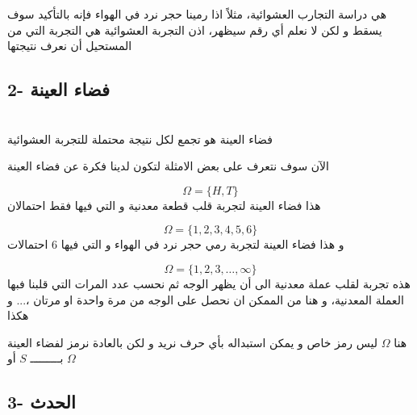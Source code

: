 \begin{definition}
	هي دراسة التجارب العشوائية، مثلاً اذا رمينا حجر نرد في الهواء فإنه بالتأكيد سوف يسقط و لكن لا نعلم أي رقم سيظهر، اذن التجربة العشوائية هي التجربة التي من المستحيل أن نعرف نتيجتها
\end{definition}

\subsection*{2- فضاء العينة}

\begin{definition}
	\\
	فضاء العينة هو تجمع لكل نتيجة محتملة للتجربة العشوائية
\end{definition}
\noindent
الآن سوف نتعرف على بعض الامثلة لتكون لدينا فكرة عن فضاء العينة

\begin{example}[1]
	\[
	\Omega = \{H, T\}
	\]
	هذا فضاء العينة لتجربة قلب قطعة معدنية و التي فيها فقط احتمالان 
\end{example}

\begin{example}[2]
	\[
	\Omega = \{1,2,3,4,5,6\}
	\]
	و هذا فضاء العينة لتجربة رمي حجر نرد في الهواء و التي فيها 6 احتمالات
\end{example}

\begin{example}[3]
	\[
	\Omega = \{1,2,3,\dots,\infty\}
	\]
	هذه تجربة لقلب عملة معدنية الى أن يظهر الوجه  ثم نحسب عدد المرات التي قلبنا فبها العملة المعدنية، و هنا من الممكن ان نحصل على الوجه من مرة واحدة او مرتان ،... و هكذا
\end{example}

\begin{note}
	هنا \(\Omega\) ليس رمز خاص و يمكن استبداله بأي حرف نريد و لكن بالعادة نرمز لفضاء العينة بـــــــــ \(S\) أو \(\Omega\)
\end{note}

\subsection*{3- الحدث}

